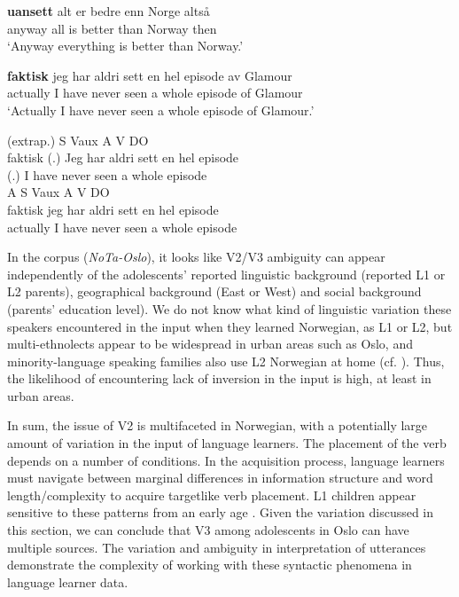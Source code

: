 \documentclass[output=paper,colorlinks,citecolor=brown,modfonts,nonflat]{../langscibook}
\begin{document}
\ea%
\settowidth{}
    \label{ex:emilsen:17}
\gll  \textbf{uansett} alt er bedre enn Norge altså\\
 anyway all is better than Norway then\\
 \glt ‘Anyway everything is better than Norway.’

\ex%
    \label{ex:emilsen:18}
\gll \textbf{faktisk} jeg har aldri sett en hel episode av Glamour\\
 actually I have never seen a whole episode of Glamour\\
 \glt ‘Actually I have never seen a whole episode of Glamour.’

 \ea\label{ex:emilsen:18a}\glll  (extrap.)  S Vaux A V DO\\
 faktisk (.) Jeg har aldri sett en hel episode\\
 [actually] (.) I have never seen a whole episode\\
 \ex \label{ex:emilsen:18b}\glll A S Vaux A V DO\\
 faktisk jeg har aldri sett en hel episode\\
 actually I have never seen a whole episode\\
\z
\z


In the corpus (\textit{NoTa-Oslo}), it looks like V2/V3 ambiguity can appear independently of the adolescents’ reported linguistic background (reported L1 or L2 parents), geographical background (East or West) and social background (parents’ education level). We do not know what kind of linguistic variation these speakers encountered in the input when they learned Norwegian, as L1 or L2, but multi-ethnolects appear to be widespread in urban areas such as Oslo, and minority-language speaking families also use L2 Norwegian at home (cf. ). Thus, the likelihood of encountering lack of inversion in the input is high, at least in urban areas. 

In sum, the issue of V2 is multifaceted in Norwegian, with a potentially large amount of variation in the input of language learners. The placement of the verb depends on a number of conditions. In the acquisition process, language learners must navigate between marginal differences in information structure and word length/complexity to acquire targetlike verb placement. L1 children appear sensitive to these patterns from an early age \citep[1854]{Westergaard2008}. Given the variation discussed in this section, we can conclude that V3 among adolescents in Oslo can have multiple sources. The variation and ambiguity in interpretation of utterances demonstrate the complexity of working with these syntactic phenomena in language learner data. 
\end{document}
